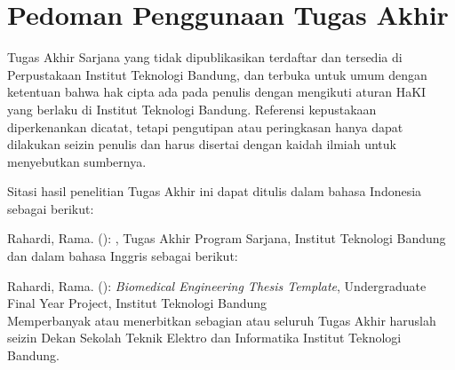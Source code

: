 \clearpage
\chapter*{Pedoman Penggunaan Tugas Akhir}

Tugas Akhir Sarjana yang tidak dipublikasikan terdaftar dan tersedia di Perpustakaan Institut Teknologi Bandung, dan terbuka untuk umum dengan ketentuan bahwa hak cipta ada pada penulis dengan mengikuti aturan HaKI yang berlaku di Institut Teknologi Bandung. Referensi kepustakaan diperkenankan dicatat, tetapi pengutipan atau peringkasan hanya dapat dilakukan seizin penulis dan harus disertai dengan kaidah ilmiah untuk menyebutkan sumbernya.

Sitasi hasil penelitian Tugas Akhir ini dapat ditulis dalam bahasa Indonesia sebagai berikut:

\hangindent=1.27cm Rahardi, Rama. (\the\year): \textit{\thetitle}, Tugas Akhir Program Sarjana, Institut Teknologi Bandung\\

dan dalam bahasa Inggris sebagai berikut:

\hangindent=1.27cm Rahardi, Rama. (\the\year): \textit{Biomedical Engineering Thesis Template}, Undergraduate Final Year Project, Institut Teknologi Bandung\\

Memperbanyak atau menerbitkan sebagian atau seluruh Tugas Akhir haruslah seizin Dekan Sekolah Teknik Elektro dan Informatika Institut Teknologi Bandung.

\clearpage